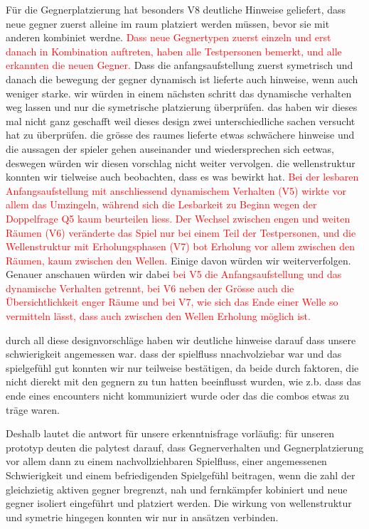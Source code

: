 \documentclass[../Main.tex]{subfiles}
\begin{document}
Für die Gegnerplatzierung hat besonders V8 deutliche Hinweise geliefert, dass neue gegner zuerst alleine im raum platziert werden müssen, bevor sie mit anderen kombiniet werdne. \textcolor{red}{Dass neue Gegnertypen zuerst einzeln und erst danach in Kombination auftreten, haben alle Testpersonen bemerkt, und alle erkannten die neuen Gegner.} Dass die anfangsaufstellung zuerst symetrisch und danach die bewegung der gegner dynamisch ist lieferte auch hinweise, wenn auch weniger starke. wir würden in einem nächsten schritt das dynamische verhalten weg lassen und nur die symetrische platzierung überprüfen. das haben wir dieses mal nicht ganz geschafft weil dieses design zwei unterschiedliche sachen versucht hat zu überprüfen. die grösse des raumes lieferte etwas schwächere hinweise und die aussagen der spieler gehen auseinander und wiedersprechen sich eetwas, deswegen würden wir diesen vorschlag nicht weiter vervolgen. die wellenstruktur  konnten wir tielweise auch beobachten, dass es was bewirkt hat. \textcolor{red}{Bei der lesbaren Anfangsaufstellung mit anschliessend dynamischem Verhalten (V5) wirkte vor allem das Umzingeln, während sich die Lesbarkeit zu Beginn wegen der Doppelfrage Q5 kaum beurteilen liess. Der Wechsel zwischen engen und weiten Räumen (V6) veränderte das Spiel nur bei einem Teil der Testpersonen, und die Wellenstruktur mit Erholungsphasen (V7) bot Erholung vor allem zwischen den Räumen, kaum zwischen den Wellen.} Einige davon würden wir weiterverfolgen. Genauer anschauen würden wir dabei \textcolor{red}{bei V5 die Anfangsaufstellung und das dynamische Verhalten getrennt, bei V6 neben der Grösse auch die Übersichtlichkeit enger Räume und bei V7, wie sich das Ende einer Welle so vermitteln lässt, dass auch zwischen den Wellen Erholung möglich ist.}

durch all diese designvorschläge haben wir deutliche hinweise darauf dass unsere schwierigkeit angemessen war. dass der spielfluss nnachvolziebar war und das spielgefühl gut konnten wir nur teilweise bestätigen, da beide durch faktoren, die nicht dierekt mit den gegnern zu tun hatten beeinflusst wurden, wie z.b. dass das ende eines encounters nicht kommuniziert wurde oder das die combos etwas zu träge waren.

Deshalb lautet die antwort für unsere erkenntnisfrage vorläufig: für unseren prototyp deuten die palytest darauf, dass Gegnerverhalten und Gegnerplatzierung vor allem dann zu einem nachvollziehbaren Spielfluss, einer angemessenen Schwierigkeit und einem befriedigenden Spielgefühl beitragen, wenn die zahl der gleichzietig aktiven gegner bregrenzt, nah und fernkämpfer kobiniert und neue gegner isoliert eingeführt und platziert werden. Die wirkung von wellenstruktur und symetrie hingegen konnten wir nur in ansätzen verbinden.
\end{document}
